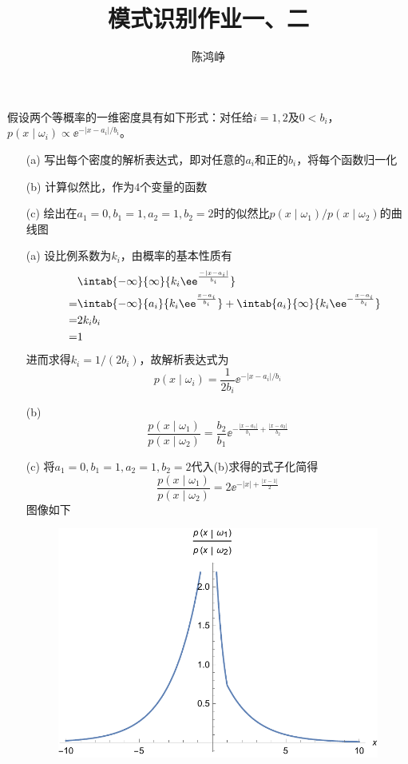 \documentclass[reportComp]{thesis}
\title{模式识别作业一、二}
\subtitle{}
\author{陈鸿峥}
\begin{document}
\maketitle

\begin{question}[\textsection 2 Q2]
假设两个等概率的一维密度具有如下形式：对任给$i=1,2$及$0<b_i$，$p(x\mid\omega_i)\propto\ee^{-|x-a_i|/b_i}$。
\begin{itemize}
	\item [(a)] 写出每个密度的解析表达式，即对任意的$a_i$和正的$b_i$，将每个函数归一化
	\item [(b)] 计算似然比，作为$4$个变量的函数
	\item [(c)] 绘出在$a_1=0,b_1=1,a_2=1,b_2=2$时的似然比$p(x\mid\omega_1)/p(x\mid\omega_2)$的曲线图
\end{itemize}
\end{question}
\begin{answer}
\begin{itemize}
	\item [(a)] 设比例系数为$k_i$，由概率的基本性质有
\[\begin{aligned}
\qquad&\intab{-\infty}{\infty}{k_i\ee^{\frac{-|x-a_i|}{b_i}}}\\
=&\intab{-\infty}{a_i}{k_i\ee^{\frac{x-a_i}{b_i}}}+\intab{a_i}{\infty}{k_i\ee^{-\frac{x-a_i}{b_i}}}\\
=&2k_ib_i\\\
=&1
\end{aligned}\]
进而求得$k_i=1/(2b_i)$，故解析表达式为
\[p(x\mid\omega_i)=\frac{1}{2b_i}\ee^{-|x-a_i|/b_i}\]
	\item [(b)]
\[\frac{p(x\mid\omega_1)}{p(x\mid\omega_2)}=\frac{b_2}{b_1}\ee^{-\frac{|x-a_1|}{b_1}+\frac{|x-a_2|}{b_2}}\]
	\item [(c)]
将$a_1=0,b_1=1,a_2=1,b_2=2$代入(b)求得的式子化简得
\[\frac{p(x\mid\omega_1)}{p(x\mid\omega_2)}=2\ee^{-|x|+\frac{|x-1|}{2}}\]
图像如下
\begin{figure}[H]
\centering
\includegraphics[width=0.5\linewidth]{likelihood.pdf}
\end{figure}
\end{itemize}
\end{answer}
\end{document}
